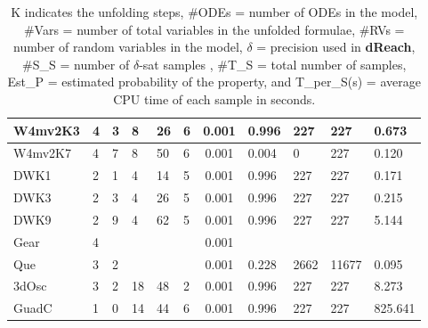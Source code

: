 \begin{table}[h]
\begin{tabular}{|l|l|l|l|l|l|c|l|l|l|l|}
    W4mv2K3       & 4       & 3 & 8      & 26     & 6     & 0.001 & 0.996      & 227         & 227        & 0.673          \\ \hline
    W4mv2K7       & 4       & 7 & 8      & 50     & 6     & 0.001 & 0.004     & 0         & 227        & 0.120               \\ \hline
    DWK1      & 2       & 1 & 4      & 14    & 5     & 0.001 & 0.996  & 227       & 227      & 0.171           \\ \hline
    DWK3      & 2       & 3 & 4      & 26    & 5     & 0.001 & 0.996  & 227       & 227      & 0.215           \\ \hline
    DWK9      & 2       & 9 & 4      & 62    & 5     & 0.001 & 0.996  & 227       & 227      & 5.144           \\ \hline
    Gear      & 4       & ~ & ~      & ~     & ~     & 0.001 & ~      & ~         & ~        & ~               \\ \hline
    Que       & 3       & 2 & ~      & ~     & ~     & 0.001 & 0.228      & 2662         & 11677        & 0.095       \\ \hline
    3dOsc     & 3       & 2 & 18      & 48     & 2     & 0.001 & 0.996      & 227         & 227        & 8.273      \\ \hline
    GuadC     & 1       & 0 & 14      & 44     & 6     & 0.001 & 0.996      & 227         & 227        & 825.641     \\ \hline
    \end{tabular}
    \caption {K indicates the unfolding steps, \#ODEs = number of ODEs in the model, \#Vars = number of total variables in the unfolded formulae, \#RVs = number of random variables in the model, $\delta$ = precision used in 
{\bf dReach}, \#S\_S = number of $\delta$-sat samples , \#T\_S = total number of samples, Est\_P = estimated 
probability of the property, and T\_per\_S(s) = average CPU time of each sample in seconds.}
    \label{table:exp}
\end{table}
